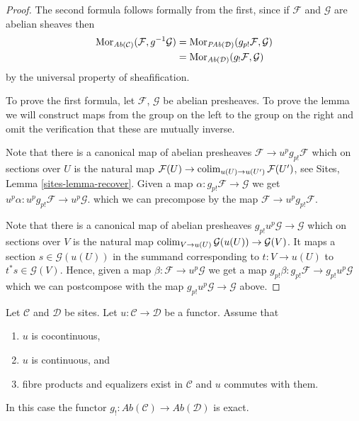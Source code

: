 \begin{proof}
The second formula follows formally from the first, since if
$\mathcal{F}$ and $\mathcal{G}$ are abelian sheaves then
\begin{align*}
\mathop{\mathrm{Mor}}\nolimits_{\textit{Ab}(\mathcal{C})}(\mathcal{F}, g^{-1}\mathcal{G})
& =
\mathop{\mathrm{Mor}}\nolimits_{\textit{PAb}(\mathcal{D})}(g_{p!}\mathcal{F}, \mathcal{G}) \\
& =
\mathop{\mathrm{Mor}}\nolimits_{\textit{Ab}(\mathcal{D})}(g_!\mathcal{F}, \mathcal{G})
\end{align*}
by the universal property of sheafification.

\medskip\noindent
To prove the first formula, let $\mathcal{F}$, $\mathcal{G}$ be abelian
presheaves. To prove the lemma we will construct maps from the group on the
left to the group on the right and omit the verification that these are
mutually inverse.

\medskip\noindent
Note that there is a canonical map of abelian presheaves
$\mathcal{F} \to u^pg_{p!}\mathcal{F}$ which on sections over $U$ is the
natural map
$\mathcal{F}(U) \to \mathop{\mathrm{colim}}\nolimits_{u(U) \to u(U')} \mathcal{F}(U')$, see
Sites, Lemma \ref{sites-lemma-recover}.
Given a map $\alpha : g_{p!}\mathcal{F} \to \mathcal{G}$
we get $u^p\alpha : u^pg_{p!}\mathcal{F} \to u^p\mathcal{G}$.
which we can precompose by the map $\mathcal{F} \to u^pg_{p!}\mathcal{F}$.

\medskip\noindent
Note that there is a canonical map of abelian presheaves
$g_{p!}u^p\mathcal{G} \to \mathcal{G}$ which on sections over
$V$ is the natural map
$\mathop{\mathrm{colim}}\nolimits_{V \to u(U)} \mathcal{G}(u(U)) \to \mathcal{G}(V)$.
It maps a section $s \in \mathcal{G}(u(U))$ in the summand corresponding to
$t : V \to u(U)$ to $t^*s \in \mathcal{G}(V)$.
Hence, given a map $\beta : \mathcal{F} \to u^p\mathcal{G}$
we get a map $g_{p!}\beta : g_{p!}\mathcal{F} \to g_{p!}u^p\mathcal{G}$
which we can postcompose with the map $g_{p!}u^p\mathcal{G} \to \mathcal{G}$
above.
\end{proof}

\begin{lemma}
\label{lemma-exactness-lower-shriek}
Let $\mathcal{C}$ and $\mathcal{D}$ be sites.
Let $u : \mathcal{C} \to \mathcal{D}$ be a functor.
Assume that
\begin{enumerate}
\item[(a)] $u$ is cocontinuous,
\item[(b)] $u$ is continuous, and
\item[(c)] fibre products and equalizers exist in $\mathcal{C}$ and
$u$ commutes with them.
\end{enumerate}
In this case the functor
$g_! : \textit{Ab}(\mathcal{C}) \to \textit{Ab}(\mathcal{D})$
is exact.
\end{lemma}

